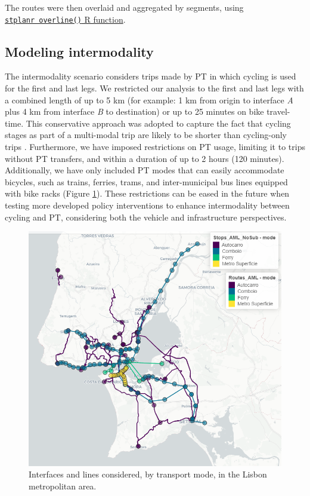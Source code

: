 \documentclass[review, doubleblind, 3p,
authoryear]{elsarticle} %
\begin{document}
The routes were then overlaid and aggregated by segments, using
\href{https://docs.ropensci.org/stplanr/reference/overline.html}{\texttt{stplanr\ overline()}
R function}.

\subsection{Modeling intermodality}\label{modeling-intermodality}

The intermodality scenario considers trips made by PT in which cycling
is used for the first and last legs. We restricted our analysis to the
first and last legs with a combined length of up to 5 km (for example: 1
km from origin to interface \emph{A} plus 4 km from interface \emph{B}
to destination) or up to 25 minutes on bike travel-time. This
conservative approach was adopted to capture the fact that cycling
stages as part of a multi-modal trip are likely to be shorter than
cycling-only trips \citep{vanmil_insights_2021}. Furthermore, we have
imposed restrictions on PT usage, limiting it to trips without PT
transfers, and within a duration of up to 2 hours (120 minutes).
Additionally, we have only included PT modes that can easily accommodate
bicycles, such as trains, ferries, trams, and inter-municipal bus lines
equipped with bike racks (Figure \ref{fig:map1}). These restrictions can
be eased in the future when testing more developed policy interventions
to enhance intermodality between cycling and PT, considering both the
vehicle and infrastructure perspectives.

\begin{figure}

{\centering \includegraphics[width=0.6\linewidth,]{img/map1} 

}

\caption{Interfaces and lines considered, by transport mode, in the Lisbon metropolitan area.}\label{fig:map1}
\end{figure}
\end{document}
